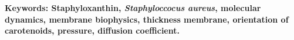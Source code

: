 \textbf{\small Keywords: Staphyloxanthin, \textit{Staphyloccocus aureus}, molecular dynamics, membrane biophysics, thickness membrane, orientation of carotenoids, pressure, diffusion coefficient.}\\
\\[2.0cm]


